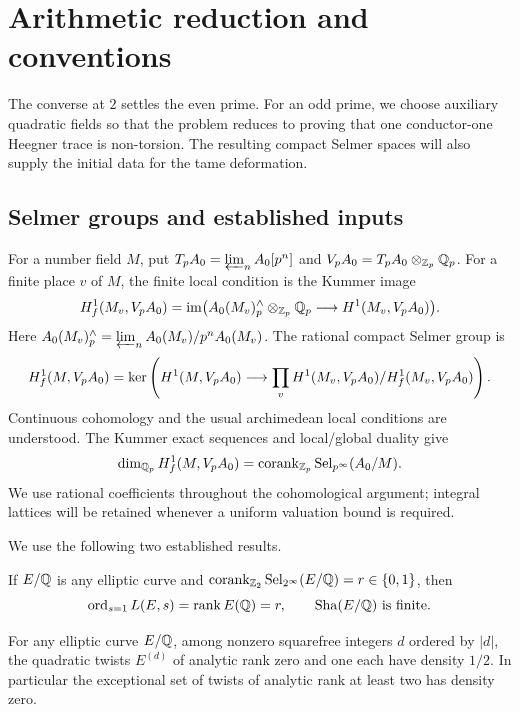 \section{Arithmetic reduction and conventions}\label{sec:reduction}

The converse at $2$ settles the even prime.  For an odd prime, we
choose auxiliary quadratic fields so that the problem reduces to
proving that one conductor-one Heegner trace is non-torsion.  The
resulting compact Selmer spaces will also supply the initial data
for the tame deformation.

\subsection{Selmer groups and established inputs}

For a number field $M$, put $T_pA_0=\varprojlim_n A_0[p^n]$ and
$V_pA_0=T_pA_0\otimes_{\mathbb Z_p}\mathbb Q_p$. For a finite place $v$ of $M$,
the finite local condition is the Kummer image
\[
 H^1_f(M_v,V_pA_0)
 =\operatorname{im}\bigl(A_0(M_v)^{\wedge}_p\otimes_{\mathbb Z_p}\mathbb Q_p
       \longrightarrow H^1(M_v,V_pA_0)\bigr).
\]
Here $A_0(M_v)^{\wedge}_p=\varprojlim_n A_0(M_v)/p^nA_0(M_v)$.
The rational compact Selmer group is
\[
 H^1_f(M,V_pA_0)=
 \ker\left(H^1(M,V_pA_0)\longrightarrow
   \prod_v H^1(M_v,V_pA_0)/H^1_f(M_v,V_pA_0)\right).
\]
Continuous cohomology and the usual archimedean local conditions are
understood. The Kummer exact sequences and local/global duality give
\begin{equation}\label{eq:compact-corank}
 \dim_{\mathbb Q_p}H^1_f(M,V_pA_0)
 =\operatorname{corank}_{\mathbb Z_p}\operatorname{Sel}_{p^\infty}(A_0/M).
\end{equation}
We use rational coefficients throughout the cohomological argument;
integral lattices will be retained whenever a uniform valuation bound
is required.

We use the following two established results.

\begin{theorem}
\label{thm:two-converse-input}
If $E/\mathbb Q$ is any elliptic curve and
$\operatorname{corank}_{\mathbb Z_2}\operatorname{Sel}_{2^\infty}(E/\mathbb Q)=r\in\{0,1\}$, then
\[
 \operatorname{ord}_{s=1}L(E,s)=\operatorname{rank} E(\mathbb Q)=r,
 \qquad \operatorname{Sha}(E/\mathbb Q)\text{ is finite}.
\]
\end{theorem}

\begin{theorem}
\label{thm:twist-density-input}
For any elliptic curve $E/\mathbb Q$, among nonzero squarefree integers $d$
ordered by $|d|$, the quadratic twists $E^{(d)}$ of analytic rank zero
and one each have density $1/2$. In particular the exceptional set of
twists of analytic rank at least two has density zero.
\end{theorem}

